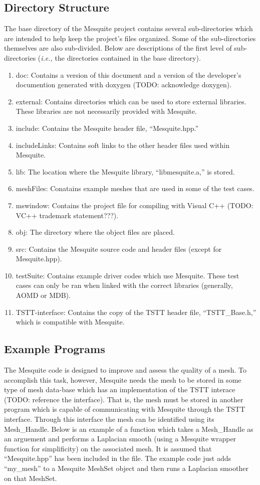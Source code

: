\subsection{Directory Structure}
The base directory of the Mesquite project contains several
sub-directories which are intended to help keep the project's
files organized.  Some of the sub-directories themselves are
also sub-divided.  Below are descriptions of the first level
of sub-directories ({\it i.e.,} the directories contained in the
base directory).
\begin{enumerate}
\item doc:  Contains a version of this document and a version of
the developer's documention generated with doxygen (TODO: acknowledge
doxygen).
\item external:  Contains directories which can be used to store external
libraries.  These libraries are not necessarily provided with Mesquite.
\item include:  Contains the Mesquite header file, ``Mesquite.hpp.''
\item includeLinks:  Contains soft links to the other header files
used within Mesquite.  
\item lib:  The location where the Mesquite library, ``libmesquite.a,'' is
stored.
\item meshFiles:  Conatains example meshes that are used in some of
the test cases.
\item mswindow:  Contains the project file for compiling with Visual C++
(TODO: VC++ trademark statement???).
\item obj:  The directory where the object files are placed.
\item src:  Contains the Mesquite source code and header files (except for
Mesquite.hpp).
\item testSuite:  Contains example driver codes which use Mesquite.  These
test cases can only be ran when linked with the correct libraries (generally,
AOMD or MDB).
\item TSTT-interface:  Contains the copy of the TSTT header file,
``TSTT\_Base.h,'' which is compatible with Mesquite.
\end{enumerate}
\subsection{Example Programs}
The Mesquite code is designed to improve and assess the quality of
a mesh.  To accomplish this task, however, Mesquite needs the mesh
to be stored in some type of mesh data-base which has an implementation
of the TSTT interace  (TODO: reference the interface).  That is, the
mesh must be stored in another program which is capable of communicating
with Mesquite through the TSTT interface.  Through this interface
the mesh can be identified using its Mesh\_Handle.  Below is an example
of a function which takes a Mesh\_Handle as an arguement and performs
a Laplacian smooth (using a Mesquite wrapper function for simplificity)
on the associated mesh.  It is assumed that ``Mesquite.hpp'' has been
included in the file.  The example code just adds ``my\_mesh'' to a
Mesquite MeshSet object and then runs a Laplacian smoother on that
MeshSet.

